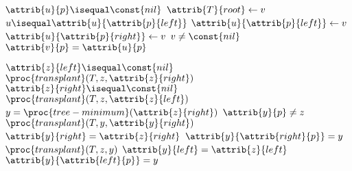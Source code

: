 \documentclass[12pt]{article}
\begin{document}
\begin{codebox}
\li \If $\attrib{u}{p} \isequal \const{nil}$
\li \Then
        $\attrib{T}{root} \gets{v}$
\li \ElseIf $u \isequal \attrib{u}{\attrib{p}{left}}$
\li \Then
        $\attrib{u}{\attrib{p}{left}} \gets{v}$
\li \Else
\li     $\attrib{u}{\attrib{p}{right}} \gets{v}$
    \End
\li \If $v \neq \const{nil}$
\li \Then
        $\attrib{v}{p} = \attrib{u}{p}$
    \End
\end{codebox}

\begin{codebox}
\li \If $\attrib{z}{left} \isequal \const{nil}$
\li \Then
        $\proc{transplant}(T, z, \attrib{z}{right})$
\li \ElseIf $\attrib{z}{right} \isequal \const{nil}$
\li \Then
        $\proc{transplant}(T, z, \attrib{z}{left})$
\li \Else
\li     $y = \proc{tree-minimum}(\attrib{z}{right})$
\li     \If $\attrib{y}{p} \neq z$
\li     \Then
            $\proc{transplant}(T, y, \attrib{y}{right})$
\li         $\attrib{y}{right} = \attrib{z}{right}$
\li         $\attrib{y}{\attrib{right}{p}} = y$
        \End
\li     $\proc{transplant}(T, z, y)$
\li     $\attrib{y}{left} = \attrib{z}{left}$
\li     $\attrib{y}{\attrib{left}{p}} = y$
    \End
\end{codebox}
\end{document}

